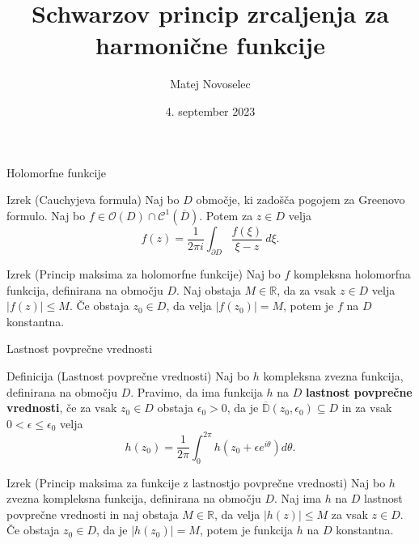 \documentclass{beamer}
\title{Schwarzov princip zrcaljenja za harmonične funkcije}
\author{Matej Novoselec}
\institute[UL FMF]{FMF Fakulteta za matematiko in fiziko}
\date{4. september 2023}
\theoremstyle{definition}
\theoremstyle{definition}
\begin{document}
\begin{frame}
   \titlepage
\end{frame}

\begin{frame}{Holomorfne funkcije}
   \begin{alertblock}{Izrek (Cauchyjeva formula)}
    Naj bo $D$ območje, ki zadošča pogojem za Greenovo formulo. 
    Naj bo $f \in \mathcal{O}(D) \cap \mathcal{C}^1(\overline{D})$. 
    Potem za $z \in D$ velja 
    $$
    f(z) = \frac{1}{2 \pi i} \int_{\partial D}{\frac{f(\xi)}{\xi - z}~d\xi}.
    $$
   \end{alertblock}
   \pause
    \begin{alertblock}{Izrek (Princip maksima za holomorfne funkcije)}
        Naj bo $f$ kompleksna holomorfna funkcija, definirana na območju $D$. 
        Naj obstaja $M \in \mathbb{R}$, da za vsak $z \in D$ velja $|f(z)| \leq M $. 
        Če obstaja $z_0 \in D$, da velja $|f(z_0)| = M$, potem je $f$ na $D$ konstantna.  
   \end{alertblock}
\end{frame}
\begin{frame}{Lastnost povprečne vrednosti}
    \begin{block}{Definicija (Lastnost povprečne vrednosti)}
        Naj bo $h$ kompleksna zvezna funkcija, definirana na območju $D$. Pravimo, da ima funkcija $h$ na $D$ \textbf{lastnost povprečne vrednosti}, če za vsak $z_0 \in D$ obstaja $\epsilon_0 > 0$, da je $\overline{\mathbb{D}}(z_0, \epsilon_0) \subseteq D$ in za vsak $0 < \epsilon \leq \epsilon_0 $ velja
        $$
            h(z_0) = \frac{1}{2 \pi} \int_{0}^{2 \pi}{h(z_0 + \epsilon e^{i \theta}) d\theta}.
        $$
    \end{block}
    \pause
     \begin{alertblock}{Izrek (Princip maksima za funkcije z lastnostjo povprečne vrednosti)}
        Naj bo $h$ zvezna kompleksna funkcija, definirana na območju $D$. Naj ima $h$ na $D$ lastnost povprečne vrednosti in naj obstaja $M \in \mathbb{R}$, da velja $|h(z)| \leq M$ za vsak $z \in D$. 
        Če obstaja $z_0 \in D$, da je $|h(z_0)| = M$, potem je funkcija $h$ na $D$ konstantna. 
    \end{alertblock}
 \end{frame}
\end{document}
